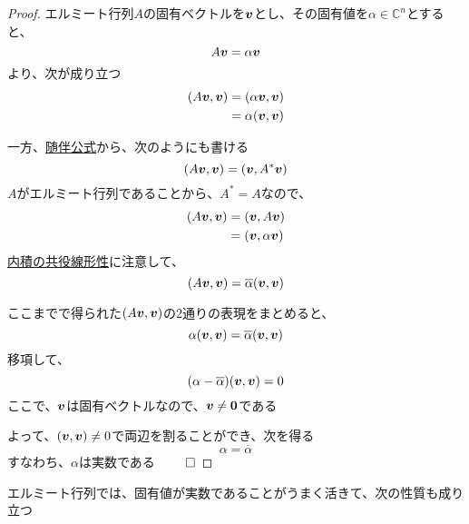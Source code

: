 \documentclass[../../../topic_linear-algebra]{subfiles}
\begin{document}
\begin{proof}
  エルミート行列$A$の固有ベクトルを$\vb*{v}$とし、その固有値を$\alpha \in \mathbb{C}^n$とすると、
  \begin{equation*}
    A\vb*{v} = \alpha \vb*{v}
  \end{equation*}
  より、次が成り立つ
  \begin{align*}
    (A\vb*{v}, \vb*{v}) & = (\alpha \vb*{v}, \vb*{v}) \\
                        & = \alpha (\vb*{v}, \vb*{v})
  \end{align*}
  \br

  一方、\hyperref[thm:adjoint-identity]{随伴公式}から、次のようにも書ける
  \begin{equation*}
    (A\vb*{v}, \vb*{v}) = (\vb*{v}, A^*\vb*{v})
  \end{equation*}
  $A$がエルミート行列であることから、$A^* = A$なので、
  \begin{align*}
    (A\vb*{v}, \vb*{v}) & = (\vb*{v}, A\vb*{v})      \\
                        & = (\vb*{v}, \alpha\vb*{v})
  \end{align*}
  \hyperref[thm:conjugate-linearity-of-inner-product]{内積の共役線形性}に注意して、
  \begin{equation*}
    (A\vb*{v}, \vb*{v}) = \overline{\alpha}(\vb*{v}, \vb*{v})
  \end{equation*}

  \br

  ここまでで得られた$(A\vb*{v}, \vb*{v})$の2通りの表現をまとめると、
  \begin{equation*}
    \alpha (\vb*{v}, \vb*{v}) = \overline{\alpha}(\vb*{v}, \vb*{v})
  \end{equation*}
  移項して、
  \begin{equation*}
    (\alpha - \overline{\alpha})(\vb*{v}, \vb*{v}) = 0
  \end{equation*}
  ここで、$\vb*{v}$は固有ベクトルなので、$\vb*{v} \neq \vb*{0}$である

  よって、$(\vb*{v}, \vb*{v}) \neq 0$で両辺を割ることができ、次を得る
  \begin{equation*}
    \alpha = \overline{\alpha}
  \end{equation*}
  すなわち、$\alpha$は実数である $\qed$
\end{proof}

\sectionline

エルミート行列では、固有値が実数であることがうまく活きて、次の性質も成り立つ
\end{document}
